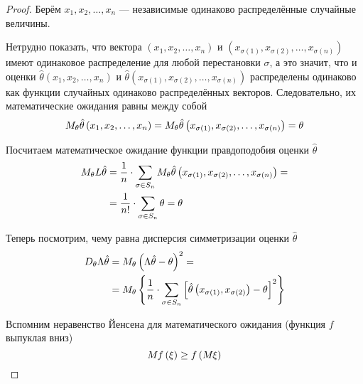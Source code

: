 \begin{proof}
    Берём $x_1, x_2, \dots, x_n$ --- независимые одинаково распределённые
    случайные величины.

    Нетрудно показать, что  вектора $\left(x_1, x_2, \dots, x_n\right)$ и
    $\left(x_{\sigma\left(1\right)}, x_{\sigma\left(2\right)},
        \dots, x_{\sigma\left(n\right)}\right)$
    имеют одинаковое распределение для любой перестановки $\sigma$,
    а это значит, что и оценки
    $\hat{\theta}\left(x_1, x_2, \dots, x_n\right)$ и
    $\hat{\theta}\left(x_{\sigma\left(1\right)}, x_{\sigma\left(2\right)},
        \dots, x_{\sigma\left(n\right)}\right)$
    распределены одинаково
    как функции случайных одинаково распределённых векторов.
    Следовательно, их математические ожидания равны между собой
    $$M_{\theta} \hat{\theta}\left(x_1, x_2, \dots, x_n\right)
        =M_{\theta} 
            \hat{\theta}\left(x_{\sigma\left(1\right)},
                x_{\sigma\left(2\right)},
                \dots, x_{\sigma\left(n\right)}\right)
        =\theta$$

    Посчитаем математическое ожидание функции правдоподобия оценки
    $\hat{\theta}$
    \begin{align*}
        M_{\theta} L\hat{\theta}
            &=\frac{1}{n}\cdot\sum_{\sigma\in S_n}
            M_{\theta} \hat{\theta}\left(x_{\sigma\left(1\right)},
                    x_{\sigma\left(2\right)},
                    \dots, x_{\sigma\left(n\right)}\right)=\\
            &=\frac{1}{n!}\cdot\sum_{\sigma\in S_n}\theta
            =\theta
    \end{align*}

    Теперь посмотрим, чему равна дисперсия симметризации оценки $\hat{\theta}$
    \begin{align*}
        D_{\theta} \Lambda\hat{\theta}
            &=M_{\theta} \left(\Lambda\hat{\theta}-\theta\right)^2=\\
            &=M_{\theta} \left\{\frac{1}{n}\cdot\sum_{\sigma\in S_n}
                \left[\hat{\theta}\left(x_{\sigma\left(1\right)},
                    x_{\sigma\left(2\right)}\right)
                    -\theta
                    \right]^2
                    \right\}
    \end{align*}

    Вспомним неравенство Йенсена для математического ожидания
    (функция $f$ выпуклая вниз)
    $$M_{} f\left(\xi\right)\ge f\left(M_{} \xi\right)$$


\end{proof}
